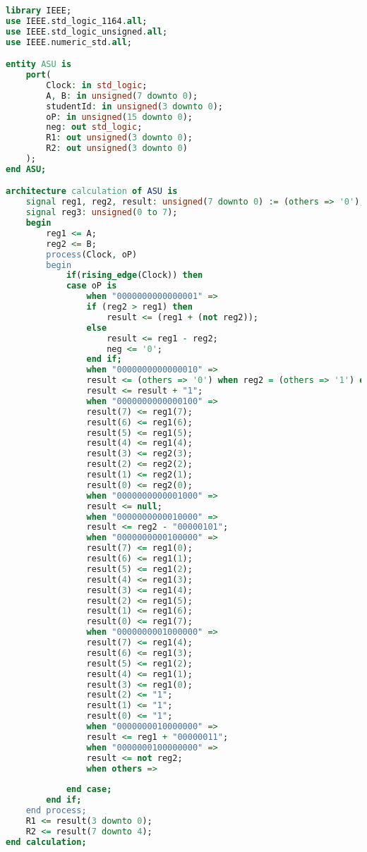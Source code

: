 
\begin{lstlisting}[language=VHDL, caption={}]
library IEEE;
use IEEE.std_logic_1164.all;
use IEEE.std_logic_unsigned.all;
use IEEE.numeric_std.all;

entity ASU is
    port(
        Clock: in std_logic;
        A, B: in unsigned(7 downto 0);
        studentId: in unsigned(3 downto 0);
        oP: in unsigned(15 downto 0);
        neg: out std_logic;
        R1: out unsigned(3 downto 0);
        R2: out unsigned(3 downto 0)
    );
end ASU;

architecture calculation of ASU is
    signal reg1, reg2, result: unsigned(7 downto 0) := (others => '0');
    signal reg3: unsigned(0 to 7);
    begin
        reg1 <= A;
        reg2 <= B;
        process(Clock, oP)
        begin
            if(rising_edge(Clock)) then 
            case oP is
                when "0000000000000001" =>
                if (reg2 > reg1) then
                    result <= (reg1 + (not reg2));
                else
                    result <= reg1 - reg2;
                    neg <= '0';
                end if;
                when "0000000000000010" =>
                result <= (others => '0') when reg2 = (others => '1') else not reg2;
                result <= result + "1";
                when "0000000000000100" =>
                result(7) <= reg1(7);
                result(6) <= reg1(6);
                result(5) <= reg1(5);
                result(4) <= reg1(4);
                result(3) <= reg2(3);
                result(2) <= reg2(2);
                result(1) <= reg2(1);
                result(0) <= reg2(0);
                when "0000000000001000" =>
                result <= null;
                when "0000000000010000" =>
                result <= reg2 - "00000101";
                when "0000000000100000" =>
                result(7) <= reg1(0);
                result(6) <= reg1(1);
                result(5) <= reg1(2);
                result(4) <= reg1(3);
                result(3) <= reg1(4);
                result(2) <= reg1(5);
                result(1) <= reg1(6);
                result(0) <= reg1(7);
                when "0000000001000000" =>
                result(7) <= reg1(4);
                result(6) <= reg1(3);
                result(5) <= reg1(2);
                result(4) <= reg1(1);
                result(3) <= reg1(0);
                result(2) <= "1";
                result(1) <= "1";
                result(0) <= "1";
                when "0000000010000000" =>
                result <= reg1 + "00000011";
                when "0000000100000000" =>
                result <= not reg2;
                when others =>
                
            end case;
        end if;
    end process;
    R1 <= result(3 downto 0);
    R2 <= result(7 downto 4);
end calculation;  
\end{lstlisting}


